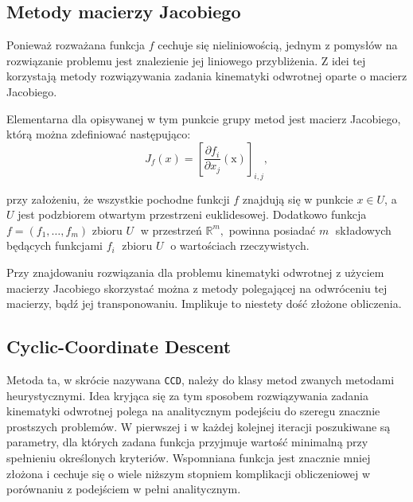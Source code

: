 \documentclass[11pt]{mwrep}
\begin{document}
    \subsection{Metody macierzy Jacobiego}

Ponieważ rozważana funkcja $f$ cechuje się nieliniowością, jednym z pomysłów na rozwiązanie problemu jest znalezienie jej liniowego przybliżenia. Z idei tej korzystają metody rozwiązywania zadania kinematyki odwrotnej oparte o macierz Jacobiego.

Elementarna dla opisywanej w tym punkcie grupy metod jest macierz Jacobiego, którą można zdefiniować następująco:
$$J_f(x) = \left[\frac{\partial f_i}{\partial x_j}(\mathrm x)\right]_{i, j} ,$$

przy założeniu, że wszystkie pochodne funkcji $f$  znajdują się w punkcie $x\in U$, a $U$ jest podzbiorem otwartym przestrzeni euklidesowej. Dodatkowo funkcja $ f = (f_1, \dots, f_m)$ zbioru $U\;$ w przestrzeń $ \mathbb{R}^m,$ powinna posiadać $m\;$ składowych będących funkcjami $f_i\;$ zbioru $U\;$ o wartościach rzeczywistych.

Przy znajdowaniu rozwiązania dla problemu kinematyki odwrotnej z użyciem macierzy Jacobiego skorzystać można z metody polegającej na odwróceniu tej macierzy, bądź jej transponowaniu. Implikuje to niestety dość złożone obliczenia.

    \subsection{Cyclic-Coordinate Descent}

  Metoda ta, w skrócie nazywana \texttt{CCD}, należy do klasy metod zwanych metodami heurystycznymi. Idea kryjąca się za tym sposobem rozwiązywania zadania kinematyki odwrotnej polega na analitycznym podejściu do szeregu znacznie prostszych problemów. W pierwszej i w każdej kolejnej iteracji poszukiwane są parametry, dla których zadana funkcja przyjmuje wartość minimalną przy spełnieniu określonych kryteriów. Wspomniana funkcja jest znacznie mniej złożona i cechuje się o wiele niższym stopniem komplikacji obliczeniowej w porównaniu z podejściem w pełni analitycznym.
\end{document}
